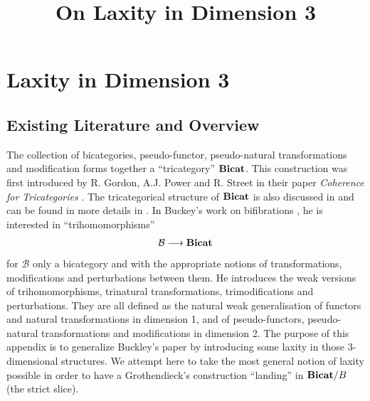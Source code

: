 \documentclass{article}
\title{On Laxity in Dimension 3}
\author{}
\date{}
\numberwithin{equation}{section}
\theoremstyle{definition}
\theoremstyle{plain}
\newcommand{\Bicat}{\textnormal{\textbf{Bicat}}}
\begin{document}
	
	\maketitle
	
	\tableofcontents
	
	\newpage
	
\section{Laxity in Dimension 3}

\subsection{Existing Literature and Overview}

The collection of bicategories, pseudo-functor, pseudo-natural transformations and modification forms together a ``tricategory'' $\Bicat$. This construction was first introduced by R. Gordon, A.J. Power and R. Street in their paper \textit{Coherence for Tricategories} \cite{gordon1995coherence}. The tricategorical structure of $\Bicat$ is also discussed in \cite{gurski_2013} and can be found in more details in \cite{johnson20202dimensional}. In Buckey's work on bifibrations \cite{buckley2013fibred}, he is interested in ``trihomomorphisms''
\[\mathcal{B} \longrightarrow \Bicat\]
for $\mathcal{B}$ only a bicategory and with the appropriate notions of transformations, modifications and perturbations between them. He introduces the weak versions of trihomomorphisms, trinatural transformations, trimodifications and perturbations. They are all defined as the natural weak generalisation of functors and natural transformations in dimension 1, and of pseudo-functors, pseudo-natural transformations and modifications in dimension 2. The purpose of this appendix is to generalize Buckley's paper by introducing some laxity in those 3-dimensional structures. We attempt here to take the most general notion of laxity possible in order to have a Grothendieck's construction ``landing'' in $\Bicat/B$ (the strict slice).
\end{document}
